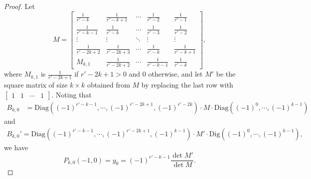 \documentclass[11pt]{amsart}
\theoremstyle{definition}
\numberwithin{equation}{subsection}
\theoremstyle{plain}
\theoremstyle{plain}
\theoremstyle{plain}
\theoremstyle{plain}
\theoremstyle{plain}
\theoremstyle{plain}
\theoremstyle{plain}
\theoremstyle{plain}
\theoremstyle{plain}
\theoremstyle{plain}
\theoremstyle{plain}
\theoremstyle{plain}
\theoremstyle{definition}
\theoremstyle{definition}
\theoremstyle{definition}
\theoremstyle{remark}
\renewcommand{\(}{\textup{(}}
\renewcommand{\)}{\textup{)}}
\begin{document}
\begin{proof}
Let
$$M=
        \begin{bmatrix}
          \frac{1}{r'-k} & \frac{1}{r'-k+1} & \cdots & \frac{1}{r'-2} & \frac{1}{r'-1} \\
          \frac{1}{r'-k-1} & \frac{1}{r'-k} & \cdots & \frac{1}{r'-3} & \frac{1}{r'-2} \\
          \vdots & \vdots & \ddots & \vdots & \vdots \\
          \frac{1}{r'-2k+2} & \frac{1}{r'-2k+3} & \cdots & \frac{1}{r'-k} & \frac{1}{r'-k+1} \\
          M_{k,1} & \frac{1}{r'-2k+2} & \cdots & \frac{1}{r'-k-1} & \frac{1}{r'-k}
        \end{bmatrix},$$
where $M_{k,1}$ is $\frac{1}{r'-2k+1}$ if $r'-2k+1>0$ and $0$ otherwise,
and let $M'$ be the square matrix of size $k\times k$ obtained from $M$ by replacing the last row with
$\begin{bmatrix}
  1 & 1 & \cdots & 1
\end{bmatrix}.$
Noting that
\begin{align*}
        B_{k,0}
        &=\mathrm{Diag}((-1)^{r'-k-1},\cdots,(-1)^{r'-2k+1}, (-1)^{r'-2k})
        \cdot
        M
        \cdot
        \mathrm{Diag}((-1)^0,\cdots,(-1)^{k-1})
\end{align*}
and
\begin{align*}
B_{k,0}'=\mathrm{Diag}((-1)^{r'-k-1},\cdots,(-1)^{r'-2k+1}, (-1)^{k-1})
        \cdot
        M'
        \cdot
        \mathrm{Dig}((-1)^0,\cdots,(-1)^{k-1}),
\end{align*}
we have
    \begin{equation}\label{eq: P_k,0(-1,0)}
        P_{k,0}(-1,0)=y_0
        =
        (-1)^{r'-k-1}
        \frac{\det M'}{\det M}.
    \end{equation}



\end{proof}
\end{document}
